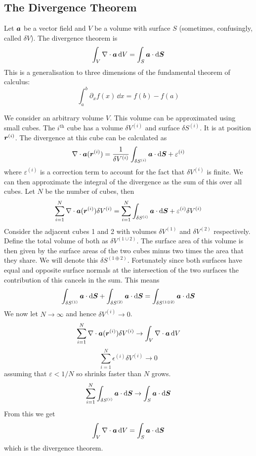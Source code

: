 \documentclass{article}
\begin{document}
    \subsection{The Divergence Theorem}
    Let \(\bm{a}\) be a vector field and \(V\) be a volume with surface \(S\) (sometimes, confusingly, called \(\delta V\)).
    The divergence theorem is
    \[\int_V\nabla\cdot\bm{a}\,\dd V = \int_S\bm{a}\cdot\dd\bm{S}\]
    This is a generalisation to three dimensions of the fundamental theorem of calculus:
    \[\int_a^b\partial_xf(x)\,\dd x = f(b) - f(a)\]
    
    We consider an arbitrary volume \(V\).
    This volume can be approximated using small cubes.
    The \(i^\text{th}\) cube has a volume \(\delta V^{(i)}\) and surface \(\delta S^{(i)}\).
    It is at position \(\bm{r}^{(i)}\).
    The divergence at this cube can be calculated as
    \[\nabla\cdot\bm{a}(\bm{r}^{(i)}) = \frac{1}{\delta V^{(i)}} \int_{\delta S^{(i)}}\bm{a}\cdot\dd\bm{S} + \varepsilon^{(i)}\]
    where \(\varepsilon^{(i)}\) is a correction term to account for the fact that \(\delta V^{(i)}\) is finite.
    We can then approximate the integral of the divergence as the sum of this over all cubes.
    Let \(N\) be the number of cubes, then
    \[\sum_{i = 1}^N \nabla\cdot\bm{a}(\bm{r}^{(i)})\delta V^{(i)} = \sum_{i = 1}^N \int_{\delta S^{(i)}}\bm{a}\cdot\dd\bm{S} + \varepsilon^{(i)}\delta V^{(i)}\]
    Consider the adjacent cubes 1 and 2 with volumes \(\delta V^(1)\) and \(\delta V^{(2)}\) respectively.
    Define the total volume of both as \(\delta V^{(1\cup2)}\).
    The surface area of this volume is then given by the surface areas of the two cubes minus two times the area that they share.
    We will denote this \(\delta S^{(1\oplus 2)}\).
    Fortunately since both surfaces have equal and opposite surface normals at the intersection of the two surfaces the contribution of this cancels in the sum.
    This means
    \[\int_{\delta S^{(1)}}\bm{a}\cdot\dd\bm{S} + \int_{\delta S^{(2)}}\bm{a}\cdot\dd\bm{S} = \int_{\delta S^{(1\oplus 2)}}\bm{a}\cdot\dd\bm{S}\]
    We now let \(N\to\infty\) and hence \(\delta V^{(i)}\to 0\).
    \[\sum_{i = 1}^N\nabla\cdot\bm{a}(\bm{r}^{(i)})\delta V^{(i)} \to \int_V\nabla\cdot\bm{a}\,\dd V\]
    \[\sum_{i = 1}^N\epsilon^{(i)}\delta V^{(i)} \to 0\]
    assuming that \(\varepsilon < 1/N\) so shrinks faster than \(N\) grows.
    \[\sum_{i = 1}^N\int_{\delta S^{(i)}}\bm{a}\cdot\dd\bm{S} \to\int_S\bm{a}\cdot\dd\bm{S}\]
    From this we get
    \[\int_V\nabla\cdot\bm{a}\,\dd V = \int_S\bm{a}\cdot\dd\bm{S}\]
    which is the divergence theorem.
    
\end{document}
